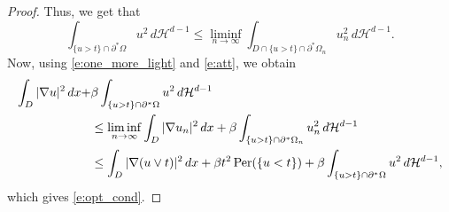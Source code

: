 \documentclass[11pt]{article}
\numberwithin{equation}{section}
\newcommand{\Per}{\mathrm{Per}}
\theoremstyle{plain}
\theoremstyle{definition}
\def\HH{\mathcal{H}}
\begin{document}
\begin{proof}
Thus, we get that
\begin{equation}\label{e:one_more_light}
\int_{\{u>t\}\cap \partial^\ast\Omega}u^2\,d\HH^{d-1}\le \liminf_{n\to\infty}\int_{D\cap\{u>t\}\cap \partial^\ast\Omega_{n}}u_{n}^2\,d\HH^{d-1}.
\end{equation}
Now, using \eqref{e:one_more_light} and \eqref{e:att}, we obtain
\begin{align}
\int_{D}|\nabla u|^2\,dx+&\beta\int_{\{u> t\}\cap \partial^\ast\Omega}u^2\,d\HH^{d-1}\notag\\
&\le \liminf_{n\to\infty}\int_{D}|\nabla u_{n}|^2\,dx+\beta\int_{\{u> t\}\cap \partial^\ast\Omega_{n}}u_{n}^2\,d\HH^{d-1}\notag\\
&\le \int_{D}|\nabla (u\vee t)|^2\,dx+\beta t^2\, \Per(\{u<t\})+\beta\int_{\{u> t\}\cap \partial^\ast\Omega}u^2\,d\HH^{d-1},\notag
\end{align}
which gives \eqref{e:opt_cond}.
\end{proof}
\end{document}
